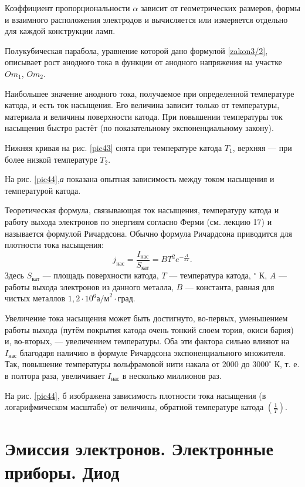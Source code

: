 \documentclass[a4paper,10pt]{book}
\begin{document}
Коэффициент пропорциональности $\alpha$ зависит от геометрических размеров, формы и взаимного расположения электродов и вычисляется или измеряется отдельно для каждой конструкции ламп.

Полукубическая парабола, уравнение которой дано формулой \ref{zakon3/2}, описывает рост анодного тока в функции от анодного напряжения на участке $Om_1$, $Om_2$.

Наибольшее значение анодного тока, получаемое при определенной температуре катода, и есть ток насыщения. Его величина зависит только от температуры, материала и величины поверхности катода. При повышении температуры ток насыщения быстро растёт (по показательному экспоненциальному закону).

Нижняя кривая на рис. \ref{pic43} снята при температуре катода $T_1$, верхняя — при более низкой температуре $T_2$.

На рис. \ref{pic44},\textit{а} показана опытная зависимость между током насыщения и температурой катода.

Теоретическая формула, связывающая ток насыщения, температуру катода и работу выхода электронов по энергиям согласно Ферми (см. лекцию 17) и называется формулой Ричардсона. Обычно формула Ричардсона приводится для плотности тока насыщения:
\begin{equation}
j_\text{нас} = \frac{I_\text{нас}}{S_\text{кат}} = BT^{2}e^{-\frac{A}{kT}}.
\end{equation}
Здесь $S_\text{кат}$ — площадь поверхности катода, $T$ — температура катода, $^{\circ}\text{ К}$, $A$ — работы выхода электронов из данного металла, $B$ — константа, равная для чистых металлов $1,2\cdot10^{6} \text{а/м}^{2}\cdot\text{град}$.

Увеличение тока насыщения может быть достигнуто, во-первых, уменьшением работы выхода (путём покрытия катода очень тонкий слоем тория, окиси бария) и, во-вторых, — увеличением температуры. Оба эти фактора сильно влияют на $I_\text{нас}$ благодаря наличию в формуле Ричардсона экспоненциального множителя. Так, повышение температуры вольфрамовой нити накала от $2000$ до $3000^{\circ}\text{ К}$, т. е. в полтора раза, увеличивает $I_\text{нас}$ в несколько миллионов раз.

На рис. \ref{pic44}, б изображена зависимость плотности тока насыщения (в логарифмическом масштабе) от величины, обратной температуре катода $(\frac{1}{T})$.


\chapter{Эмиссия электронов. Электронные приборы. Диод}
\end{document}
